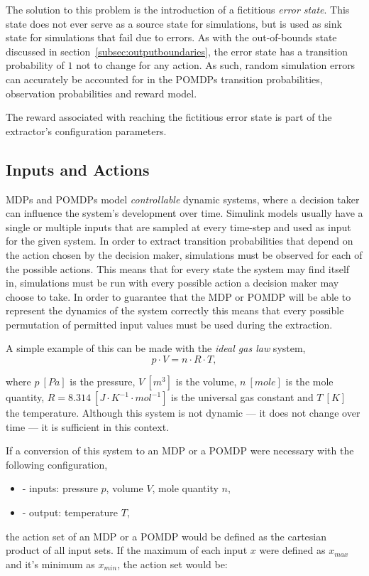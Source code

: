 The solution to this problem is the introduction of a fictitious \textit{error state}. This state does not ever serve as a source state for simulations, but is used as sink state for simulations that fail due to errors. As with the out-of-bounds state discussed in section~\ref{subsec:outputboundaries}, the error state has a transition probability of $1$ not to change for any action. As such, random simulation errors can accurately be accounted for in the POMDPs transition probabilities, observation probabilities and reward model.

The reward associated with reaching the fictitious error state is part of the extractor's configuration parameters.

\subsection{Inputs and Actions}
\label{subsec:inputsactions}

MDPs and POMDPs model \textit{controllable} dynamic systems, where a decision taker can influence the system's development over time. Simulink models usually have a single or multiple inputs that are sampled at every time-step and used as input for the given system. In order to extract transition probabilities that depend on the action chosen by the decision maker, simulations must be observed for each of the possible actions. This means that for every state the system may find itself in, simulations must be run with every possible action a decision maker may choose to take. In order to guarantee that the MDP or POMDP will be able to represent the dynamics of the system correctly this means that every possible permutation of permitted input values must be used during the extraction.

A simple example of this can be made with the \textit{ideal gas law} system,
\[
p\cdot V = n \cdot R \cdot T,
\]

where $p\ [Pa]$ is the pressure, $V\ [m^3]$ is the volume, $n\ [mole]$ is the mole quantity, $ R = 8.314\ [J\cdot K^{-1} \cdot mol^{-1}]$ is the universal gas constant and $T\ [K]$ the temperature. Although this system is not dynamic --- it does not change over time --- it is sufficient in this context.

If a conversion of this system to an MDP or a POMDP were necessary with the following configuration,

\begin{itemize}
\item - inputs: pressure $p$, volume $V$, mole quantity $n$,
\item - output: temperature $T$,
\end{itemize}
the action set of an MDP or a POMDP would be defined as the cartesian product of all input sets. If the maximum of each input $x$ were defined as $x_{max}$ and it's minimum as $x_{min}$, the action set would be:

